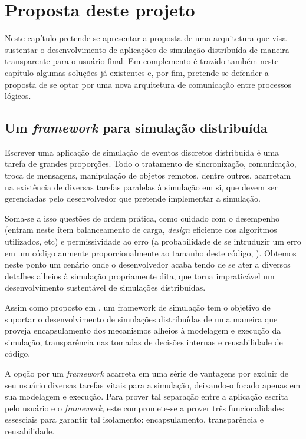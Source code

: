 \chapter{Proposta deste projeto}

Neste capítulo pretende-se apresentar a proposta de uma arquitetura que visa sustentar o desenvolvimento de aplicações de simulação distribuída de maneira transparente para o usuário final. Em complemento é trazido também neste capítulo algumas soluções já existentes e, por fim, pretende-se defender a proposta de se optar por uma nova arquitetura de comunicação entre processos lógicos.

\section{Um \textit{framework} para simulação distribuída}

Escrever uma aplicação de simulação de eventos discretos distribuída é uma tarefa de grandes proporções. Todo o tratamento de sincronização, comunicação, troca de mensagens, manipulação de objetos remotos, dentre outros, acarretam na existência de diversas tarefas paralelas à simulação em si, que devem ser gerenciadas pelo desenvolvedor que pretende implementar a simulação.

Soma-se a isso questões de ordem prática, como cuidado com o desempenho (entram neste ítem balanceamento de carga, \textit{design} eficiente dos algorítmos utilizados, etc) e permissividade ao erro (a probabilidade de se intruduzir um erro em um código aumente proporcionalmente ao tamanho deste código, \cite{HONGYU09}). Obtemos neste ponto um cenário onde o desenvolvedor acaba tendo de se ater a diversos detalhes alheios à simulação propriamente dita, que torna impraticável um desenvolvimento sustentável de simulações distribuídas.

Assim como proposto em \cite{LIVERSON}, um framework de simulação tem o objetivo de suportar o desenvolvimento de simulações distribuídas de uma maneira que proveja encapsulamento dos mecanismos alheios à modelagem e execução da simulação, transparência nas tomadas de decisões internas e reusabilidade de código.

A opção por um \textit{framework} acarreta em uma série de vantagens por excluir de seu usuário diversas tarefas vitais para a simulação, deixando-o focado apenas em sua modelagem e execução. Para prover tal separação entre a aplicação escrita pelo usuário e o \textit{framework}, este compromete-se a prover três funcionalidades essesciais para garantir tal isolamento: encapsulamento, transparência e reusabilidade.

